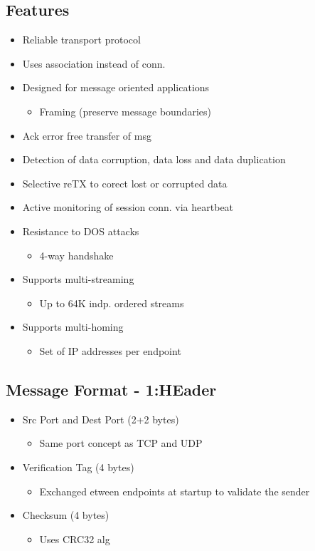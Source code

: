 \subsection{Features}
\begin{itemize}
	\item Reliable transport protocol
	\item Uses association instead of conn.
	\item Designed for message oriented applications
		\begin{itemize}
			\item Framing (preserve message boundaries)
		\end{itemize}
	\item Ack error free transfer of msg
	\item Detection of data corruption, data loss and data duplication
	\item Selective reTX to corect lost or corrupted data
	\item Active monitoring of session conn. via heartbeat
	\item Resistance to DOS attacks
	\begin{itemize}
		\item 4-way handshake
	\end{itemize}
	\item Supports multi-streaming
	\begin{itemize}
		\item Up to 64K indp. ordered streams
	\end{itemize}
	\item Supports multi-homing
	\begin{itemize}
		\item Set of IP addresses per endpoint
	\end{itemize}
\end{itemize}
\subsection{Message Format - 1:HEader}
\begin{itemize}
	\item Src Port and Dest Port (2+2 bytes)
	\begin{itemize}
		\item Same port concept as TCP and UDP
	\end{itemize}
	\item Verification Tag (4 bytes)
	\begin{itemize}
		\item Exchanged etween endpoints at startup to validate the
			sender
	\end{itemize}
\item Checksum (4 bytes)
	\begin{itemize}
		\item Uses CRC32 alg
	\end{itemize}
\end{itemize}
